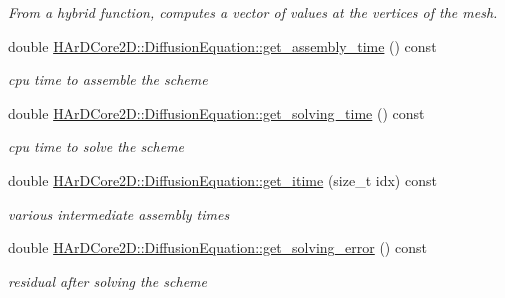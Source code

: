 \begin{DoxyCompactItemize}
\begin{DoxyCompactList}\small\item\em From a hybrid function, computes a vector of values at the vertices of the mesh. \end{DoxyCompactList}\item 
\mbox{\label{group__HHO__diffusion_gad295fde4e7f6dfb97a1f25f7d244e1fb}} 
double \hyperlink{group__HHO__diffusion_gad295fde4e7f6dfb97a1f25f7d244e1fb}{H\+Ar\+D\+Core2\+D\+::\+Diffusion\+Equation\+::get\+\_\+assembly\+\_\+time} () const
\begin{DoxyCompactList}\small\item\em cpu time to assemble the scheme \end{DoxyCompactList}\item 
\mbox{\label{group__HHO__diffusion_gadaf75d443cbf042a1ab65f2953350499}} 
double \hyperlink{group__HHO__diffusion_gadaf75d443cbf042a1ab65f2953350499}{H\+Ar\+D\+Core2\+D\+::\+Diffusion\+Equation\+::get\+\_\+solving\+\_\+time} () const
\begin{DoxyCompactList}\small\item\em cpu time to solve the scheme \end{DoxyCompactList}\item 
\mbox{\label{group__HHO__diffusion_ga0b37dd7fcb623ae4e6679cd9eed55a50}} 
double \hyperlink{group__HHO__diffusion_ga0b37dd7fcb623ae4e6679cd9eed55a50}{H\+Ar\+D\+Core2\+D\+::\+Diffusion\+Equation\+::get\+\_\+itime} (size\+\_\+t idx) const
\begin{DoxyCompactList}\small\item\em various intermediate assembly times \end{DoxyCompactList}\item 
\mbox{\label{group__HHO__diffusion_ga630e8768b1d21686fac8ace701fb7f25}} 
double \hyperlink{group__HHO__diffusion_ga630e8768b1d21686fac8ace701fb7f25}{H\+Ar\+D\+Core2\+D\+::\+Diffusion\+Equation\+::get\+\_\+solving\+\_\+error} () const
\begin{DoxyCompactList}\small\item\em residual after solving the scheme \end{DoxyCompactList}\end{DoxyCompactItemize}


